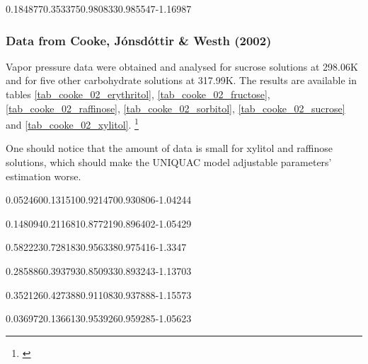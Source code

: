 %
	{0.184877}{0.353375}{0.980833}{0.985547}{-1.16987}


\FloatBarrier

\subsubsection{Data from Cooke, Jónsdóttir \& Westh (2002)}

Vapor pressure data were obtained and analysed for sucrose solutions at 298.06K
and for five other carbohydrate solutions at 317.99K. The results are available
in tables \ref{tab_cooke_02_erythritol}, \ref{tab_cooke_02_fructose},
\ref{tab_cooke_02_raffinose}, \ref{tab_cooke_02_sorbitol},
\ref{tab_cooke_02_sucrose} and \ref{tab_cooke_02_xylitol}.
\footnote{\cite{cooke2002a}}

One should notice that the amount of data is small for xylitol and raffinose
solutions, which should make the UNIQUAC model adjustable parameters' estimation
worse.


%
	{0.052460}{0.131510}{0.921470}{0.930806}{-1.04244}

%
	{0.148094}{0.211681}{0.877219}{0.896402}{-1.05429}

%
	{0.582223}{0.728183}{0.956338}{0.975416}{-1.3347}

%
	{0.285886}{0.393793}{0.850933}{0.893243}{-1.13703}

%
	{0.352126}{0.427388}{0.911083}{0.937888}{-1.15573}

%
	{0.036972}{0.136613}{0.953926}{0.959285}{-1.05623}


